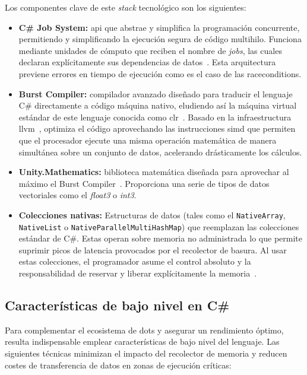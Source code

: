 Los componentes clave de este \textit{stack} tecnológico son los siguientes:

\begin{itemize}
    \item \textbf{C\# Job System:} \acrshort{api} que abstrae y simplifica la programación concurrente, permitiendo y simplificando la ejecución segura de código multihilo.
    Funciona mediante unidades de cómputo que reciben el nombre de \textit{jobs}, las cuales declaran explícitamente sus dependencias de datos~\cite{unity_job_system}.
    Esta arquitectura previene errores en tiempo de ejecución como es el caso de las \glspl{racecondition}.
    \item \textbf{Burst Compiler:} compilador avanzado diseñado para traducir el lenguaje C\# directamente a código máquina nativo, eludiendo así la máquina virtual estándar de este lenguaje conocida como \acrfull{clr}~\cite{burstcompiler}.
    Basado en la infraestructura \gls{llvm}~\cite{llvm2004}, optimiza el código aprovechando las instrucciones \acrfull{simd} que permiten que el procesador ejecute una misma operación matemática de manera simultánea sobre un conjunto de datos, acelerando drásticamente los cálculos.
    \item \textbf{Unity.Mathematics:}
    biblioteca matemática diseñada para aprovechar al máximo el Burst Compiler~\cite{unity_mathematics}.
    Proporciona una serie de tipos de datos vectoriales como el \textit{float3} o \textit{int3}.
    \item \textbf{Colecciones nativas:}
    Estructuras de datos (tales como el \texttt{NativeArray}, \texttt{NativeList} o \texttt{NativeParallelMultiHashMap}) que reemplazan las colecciones estándar de C\#.
    Estas operan sobre memoria no administrada lo que permite suprimir picos de latencia provocados por el recolector de basura.
    Al usar estas colecciones, el programador asume el control absoluto y la responsabilidad de reservar y liberar explícitamente la memoria~\cite{unity_collections}.
\end{itemize}

\subsection{Características de bajo nivel en C\#}

Para complementar el ecosistema de \acrshort{dots} y asegurar un rendimiento óptimo, resulta indispensable emplear características de bajo nivel del lenguaje.
Las siguientes técnicas minimizan el impacto del recolector de memoria y reducen costes de transferencia de datos en zonas de ejecución críticas:

